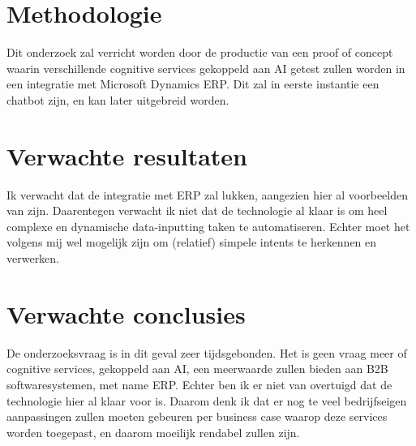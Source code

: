 \section{Methodologie}
\label{sec:methodologie}

Dit onderzoek zal verricht worden door de productie van een proof of concept waarin verschillende cognitive services gekoppeld aan AI getest zullen worden in een integratie met Microsoft Dynamics ERP. Dit zal in eerste instantie een chatbot zijn, en kan later uitgebreid worden. 

\section{Verwachte resultaten}
\label{sec:verwachte_resultaten}

Ik verwacht dat de integratie met ERP zal lukken, aangezien hier al voorbeelden van zijn.  Daarentegen verwacht ik niet dat de technologie al klaar is om heel complexe en dynamische data-inputting taken te automatiseren. Echter moet het volgens mij wel mogelijk zijn om (relatief) simpele intents te herkennen en verwerken.  

\section{Verwachte conclusies}
\label{sec:verwachte_conclusies}

De onderzoeksvraag is in dit geval zeer tijdsgebonden. Het is geen vraag meer of cognitive services, gekoppeld aan AI, een meerwaarde zullen bieden aan B2B softwaresystemen, met name ERP. Echter ben ik er niet van overtuigd dat de technologie hier al klaar voor is. Daarom denk ik dat er nog te veel bedrijfseigen aanpassingen zullen moeten gebeuren per business case waarop deze services worden toegepast, en daarom moeilijk rendabel zullen zijn. 

